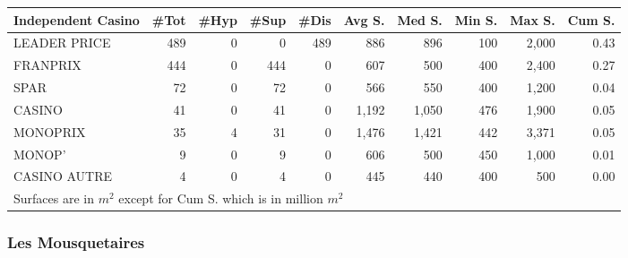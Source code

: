 \documentclass[11pt]{article}
\begin{document}
\begin{table}[H]
\footnotesize
\setlength{\tabcolsep}{2pt}

\begin{tabular}{lrrrrrrrrr}
\toprule
Independent Casino &       \#Tot &       \#Hyp &       \#Sup &       \#Dis &     Avg S. &     Med S. &     Min S. &     Max S. &     Cum S. \\
\midrule
LEADER PRICE &        489 &          0 &          0 &        489 &        886 &        896 &        100 &      2,000 &       0.43 \\
FRANPRIX     &        444 &          0 &        444 &          0 &        607 &        500 &        400 &      2,400 &       0.27 \\
SPAR         &         72 &          0 &         72 &          0 &        566 &        550 &        400 &      1,200 &       0.04 \\
CASINO       &         41 &          0 &         41 &          0 &      1,192 &      1,050 &        476 &      1,900 &       0.05 \\
MONOPRIX     &         35 &          4 &         31 &          0 &      1,476 &      1,421 &        442 &      3,371 &       0.05 \\
MONOP'       &          9 &          0 &          9 &          0 &        606 &        500 &        450 &      1,000 &       0.01 \\
CASINO AUTRE &          4 &          0 &          4 &          0 &        445 &        440 &        400 &        500 &       0.00 \\
\bottomrule
\multicolumn{10}{l}{\footnotesize Surfaces are in $m^2$ except for Cum S. which is in million $m^2$} \\
\end{tabular}

\end{table}

\subsubsection{Les Mousquetaires}
\end{document}
